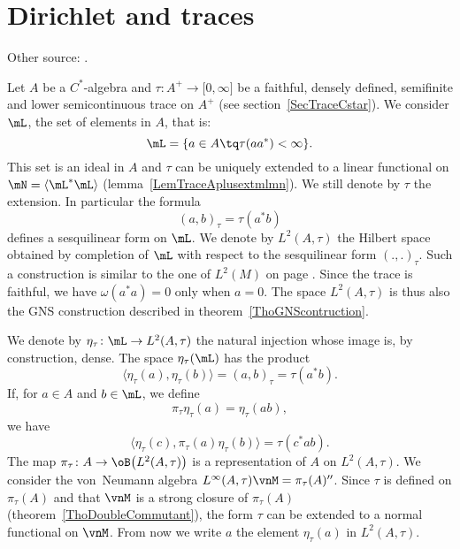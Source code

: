 \section{Dirichlet and traces}

Other source: \cite{CiprianiStandardForms,CiprianiSauvageotSquareRoots}.

Let $A$ be a $C^*$-algebra and $\tau\colon A^+\to \mathopen[ 0 , \infty \mathclose]$ be a faithful, densely defined, semifinite and lower semicontinuous trace on $A^+$ (see section~\ref{SecTraceCstar}). We consider \(\mL\), the set of  elements in \(A\), that is:
\begin{equation}
	\mL=\{ a\in A\tq \tau(aa^*)<\infty \}.
\end{equation}
This set is an ideal in $A$ and $\tau$ can be uniquely extended to a linear functional on $\mN=\langle \mL^*\mL\rangle$ (lemma~\ref{LemTraceAplusextmlmn}). We still denote by $\tau$ the extension. In particular the formula
\begin{equation}
	(a,b)_{\tau}=\tau(a^*b)
\end{equation}
defines a sesquilinear form on $\mL$. We denote by $L^2(A,\tau)$ the Hilbert space obtained by completion of $\mL$ with respect to the sesquilinear form $(.,.)_{\tau}$. Such a construction is similar to the one of $L^2(M)$ on page \pageref{PgLdM}. Since the trace is faithful, we have \(\omega(a^*a)=0\) only when \(a=0\). The space \(L^2(A,\tau)\) is thus also the GNS construction described in theorem~\ref{ThoGNScontruction}.

We denote by $\eta_{\tau}\colon \mL\to L^2(A,\tau)$ the natural injection whose image is, by construction, dense. The space $\eta_{\tau}(\mL)$ has the product
\begin{equation}
	\langle \eta_{\tau}(a), \eta_{\tau}(b)\rangle =(a,b)_{\tau}=\tau(a^*b).
\end{equation}
If, for $a\in A$ and $b\in\mL$, we define
\begin{equation}
	\pi_{\tau}\eta_{\tau}(a)=\eta_{\tau}(ab),
\end{equation}
we have
\begin{equation}
	\langle \eta_{\tau}(c), \pi_{\tau}(a)\eta_{\tau}(b)\rangle =\tau(c^*ab).
\end{equation}
The map $\pi_{\tau}\colon A\to \oB\big(L^2(A,\tau)\big)$ is a representation of $A$ on $L^2(A,\tau)$. We consider the von~Neumann algebra $L^{\infty}(A,\tau)\vnM=\pi_{\tau}(A)''$. Since $\tau$ is defined on $\pi_{\tau}(A)$ and that $\vnM$ is a strong closure of $\pi_{\tau}(A)$ (theorem~\ref{ThoDoubleCommutant}), the form $\tau$ can be extended to a normal functional on $\vnM$. From now we write $a$ the element $\eta_{\tau}(a)$ in $L^2(A,\tau)$.

